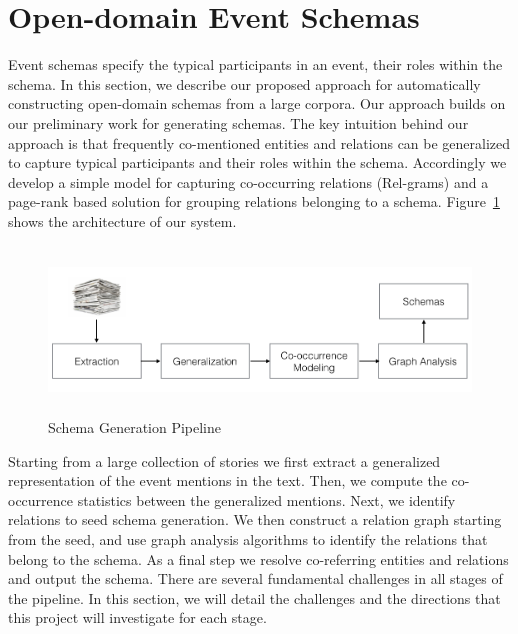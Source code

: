 \section{Open-domain Event Schemas}

Event schemas specify the typical participants in an event, their roles within the schema. In this section, we describe our proposed approach for automatically constructing open-domain schemas from a large corpora. Our approach builds on our preliminary work for generating schemas. The key intuition behind our approach is that frequently co-mentioned entities and relations can be generalized to capture typical participants and their roles within the schema. Accordingly we develop a simple model for capturing co-occurring relations (Rel-grams) and a page-rank based solution for grouping relations belonging to a schema. Figure~\ref{fig:schema-generation} shows the architecture of our system. 
\begin{figure}[htbp]
\vspace{-2ex}
\begin{center}
\includegraphics[height=1.75in, width=5.25in]{figures/schema-architecture}
\vspace{-4ex}
\caption{\label{fig:schema-generation}Schema Generation Pipeline}
\end{center}
\vspace{-2ex}
\end{figure}
Starting from a large collection of stories we first extract a generalized representation of the event mentions in the text. Then, we compute the co-occurrence statistics between the generalized mentions. Next, we identify relations to seed schema generation. We then construct a relation graph starting from the seed, and use graph analysis algorithms to identify the relations that belong to the schema. As a final step we resolve co-referring entities and relations and output the schema. 
There are several fundamental challenges in all stages of the pipeline. In this section, we will detail the challenges and the directions that this project will investigate for each stage.
 
